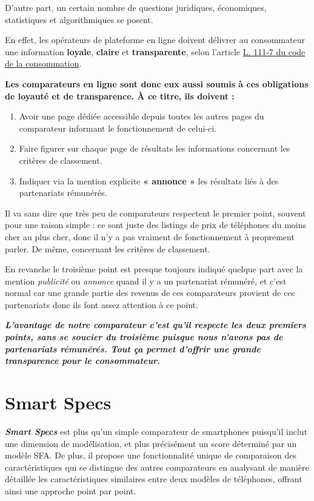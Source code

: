 \documentclass[
  12pt,
]{report}
\begin{document}
D'autre part, un certain nombre de questions juridiques, économiques,
statistiques et algorithmiques se posent.

En effet, les opérateurs de plateforme en ligne doivent délivrer au
consommateur une information \textbf{loyale}, \textbf{claire} et
\textbf{transparente}, selon l'article
\href{https://www.legifrance.gouv.fr/codes/article_lc/LEGIARTI000033219601}{L.
111-7 du code de la consommation}.

\textbf{Les comparateurs en ligne sont donc eux aussi soumis à ces
obligations de loyauté et de transparence. À ce titre, ils doivent :}

\begin{enumerate}
\def\labelenumi{\arabic{enumi}.}
\item
  Avoir une page dédiée accessible depuis toutes les autres pages du
  comparateur informant le fonctionnement de celui-ci.
\item
  Faire figurer sur chaque page de résultats les informations concernant
  les critères de classement.
\item
  Indiquer via la mention explicite \textbf{« annonce »} les résultats
  liés à des partenariats rémunérés.
\end{enumerate}

Il va sans dire que très peu de comparateurs respectent le premier
point, souvent pour une raison simple : ce sont juste des listings de
prix de téléphones du moins cher au plus cher, donc il n'y a pas
vraiment de fonctionnement à proprement parler. De même, concernant les
critères de classement.

En revanche le troisième point est presque toujours indiqué quelque part
avec la mention \emph{publicité} ou \emph{annonce} quand il y a un
partenariat rémunéré, et c'est normal car une grande partie des revenus
de ces comparateurs provient de ces partenariats donc ils font assez
attention à ce point.

\textbf{\emph{L'avantage de notre comparateur c'est qu'il respecte les
deux premiers points, sans se soucier du troisième puisque nous n'avons
pas de partenariats rémunérés. Tout ça permet d'offrir une grande
transparence pour le consommateur.}}

\section{Smart Specs}\label{smart-specs}

\textbf{\emph{Smart Specs}} est plus qu'un simple comparateur de
smartphones puisqu'il inclut une dimension de modélisation, et plus
précisément un score déterminé par un modèle SFA. De plus, il propose
une fonctionnalité unique de comparaison des caractéristiques qui se
distingue des autres comparateurs en analysant de manière détaillée les
caractéristiques similaires entre deux modèles de téléphones, offrant
ainsi une approche point par point.
\end{document}
